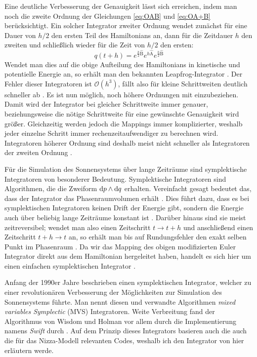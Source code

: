 \documentclass[12pt,a4paper,twoside,open=right,bibliography=totoc]{scrbook}
\renewcommand{\cite}{ \citep}
\newcommand{\OA}{\operatorname{\widehat{A}}} %
\newcommand{\OB}{\operatorname{\widehat{B}}}
\begin{document}
Eine deutliche Verbesserung der Genauigkeit lässt sich erreichen, indem man noch die zweite Ordnung der Gleichungen \ref{eq:OAB} und \ref{eq:OA+B} berücksichtigt. Ein solcher Integrator zweiter Ordnung wendet zunächst für eine Dauer von $h/2$ den ersten Teil des Hamiltonians an, dann für die Zeitdauer $h$ den zweiten und schließlich wieder für die Zeit von $h/2$ den ersten:
\begin{equation}
q(t+h)=e^{\frac{h}{2}\OB}e^{h\OA}e^{\frac{h}{2}\OB} \label{eq:secondorder}
\end{equation}
Wendet man dies auf die obige Aufteilung des Hamiltonians in kinetische und potentielle Energie an, so erhält man den bekannten Leapfrog-Integrator\cite{Duncan1998}. Der Fehler dieser Integratoren ist $\mathcal{O}(h^3)$, fällt also für kleine Schrittweiten deutlich schneller ab\cite{Chambers1999}.
Es ist nun möglich, noch höhere Ordnungen mit einzubeziehen. Damit wird der Integrator bei gleicher Schrittweite immer genauer, beziehungsweise die nötige Schrittweite für eine gewünschte Genauigkeit wird größer. Gleichzeitig werden jedoch die Mappings immer komplizierter, weshalb jeder einzelne Schritt immer rechenzeitaufwendiger zu berechnen wird. Integratoren höherer Ordnung sind deshalb meist nicht schneller als Integratoren der zweiten Ordnung\cite{Chambers1999}.

Für die Simulation des Sonnensystems über lange Zeiträume sind symplektische Integratoren von besonderer Bedeutung. Symplektische Integratoren sind Algorithmen, die die Zweiform $\dif p \wedge \dif q$ erhalten. Vereinfacht gesagt bedeutet das, dass der Integrator das Phasenraumvolumen erhält\cite{Duncan1998}. Dies führt dazu, dass es bei symplektischen Integratoren keinen Drift der Energie gibt, sondern die Energie auch über beliebig lange Zeiträume konstant ist\cite{Binney2008}. Darüber hinaus sind sie meist zeitreversibel; wendet man also einen Zeitschritt $t\to t+h$ und anschließend einen Zeitschritt $t+h\to t$ an, so erhält man bis auf Rundungsfehler den exakt selben Punkt im Phasenraum\cite{Duncan1998}.
Da wir das Mapping des obigen modifizierten Euler Integrator direkt aus dem Hamiltonian hergeleitet haben, handelt es sich hier um einen einfachen symplektischen Integrator\cite{Binney2008}.

Anfang der 1990er Jahre beschrieben \cite{Wisdom1991} einen symplektischen Integrator, welcher zu einer revolutionären Verbesserung der Möglichkeiten zur Simulation des Sonnensystems führte.
Man nennt diesen und verwandte Algorithmen \textit{mixed variables Symplectic} (MVS) Integratoren. 
Weite Verbreitung fand der Algorithmus von Wisdom und Holman vor allem durch die Implementierung namens \emph{Swift} durch \cite{Levison1994}.
Auf dem Prinzip dieses Integrators basieren auch die auch die für das Nizza-Modell relevanten Codes, weshalb ich den Integrator von \cite{Wisdom1991} hier erläutern werde.
\end{document}

